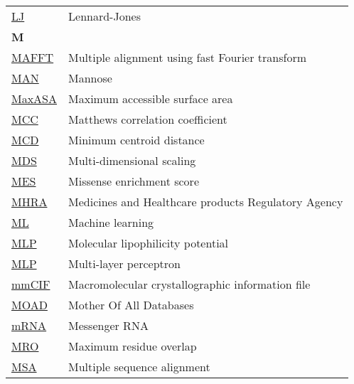 \begin{longtable}[l]{@{}p{2.5cm}p{12cm}@{}}
\textmd{\href{https://en.wikipedia.org/wiki/Lennard-Jones_potential}{LJ}} & Lennard-Jones \\[0.3175cm]
\newpage
\textbf{\large M} & \\[0.25cm]
\textmd{\href{https://en.wikipedia.org/wiki/MAFFT}{MAFFT}} & Multiple alignment using fast Fourier transform \\
\textmd{\href{https://www.ebi.ac.uk/pdbe-srv/pdbechem/chemicalCompound/show/MAN}{MAN}} & Mannose \\
\textmd{\href{https://en.wikipedia.org/wiki/Relative_accessible_surface_area}{MaxASA}} & Maximum accessible surface area \\
\textmd{\href{https://en.wikipedia.org/wiki/Phi_coefficient}{MCC}} & Matthews correlation coefficient \\
\textmd{\href{https://jcheminf.biomedcentral.com/articles/10.1186/s13321-024-00923-z}{MCD}} & Minimum centroid distance \\
\textmd{\href{https://en.wikipedia.org/wiki/Multidimensional_scaling}{MDS}} & Multi-dimensional scaling \\
\textmd{\href{https://www.nature.com/articles/s42003-024-06117-5}{MES}} & Missense enrichment score \\
\textmd{\href{https://en.wikipedia.org/wiki/Medicines_and_Healthcare_products_Regulatory_Agency}{MHRA}} & Medicines and Healthcare products Regulatory Agency \\
\textmd{\href{https://en.wikipedia.org/wiki/Machine_learning}{ML}} & Machine learning \\
\textmd{\href{https://www.cgl.ucsf.edu/chimera/data/mlp-sep2016/index.html}{MLP}} & Molecular lipophilicity potential\\
\textmd{\href{https://en.wikipedia.org/wiki/Multilayer_perceptron}{MLP}} & Multi-layer perceptron \\
\textmd{\href{https://en.wikipedia.org/wiki/Macromolecular_Crystallographic_Information_File}{mmCIF}} & Macromolecular crystallographic information file \\
\textmd{\href{https://www.nature.com/articles/s41598-023-29996-w}{MOAD}} & Mother Of All Databases \\
\textmd{\href{https://en.wikipedia.org/wiki/Messenger_RNA}{mRNA}} & Messenger RNA \\
\textmd{\href{https://jcheminf.biomedcentral.com/articles/10.1186/s13321-024-00923-z}{MRO}} & Maximum residue overlap \\
\textmd{\href{https://en.wikipedia.org/wiki/Multiple_sequence_alignment}{MSA}} & Multiple sequence alignment \\

\end{longtable}
